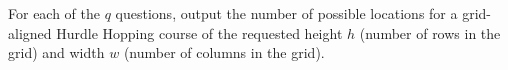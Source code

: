 
    For each of the $q$ questions,
    output the number of possible locations for a grid-aligned Hurdle Hopping course of the requested
    height $h$ (number of rows in the grid) and width $w$ (number of columns in the grid).
